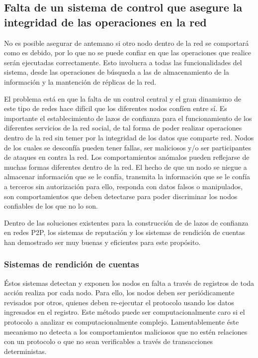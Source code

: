   \subsection{Falta de un sistema de control que asegure la integridad de las operaciones en la red}

    No es posible asegurar de antemano si otro nodo dentro de la red se
    comportará como es debido, por lo que no se puede confiar en que las
    operaciones que realice serán ejecutadas correctamente. Esto involucra a todas
    las funcionalidades del sistema, desde las operaciones de búsqueda a las de
    almacenamiento de la información y la mantención de réplicas de la red. 
    
    El problema está en que la falta de un control central y el gran dinamismo de este tipo de redes hace difícil que
    los diferentes nodos confíen entre sí. Es importante el establecimiento de
    lazos de confianza para el funcionamiento de los diferentes servicios de la red
    social, de tal forma de poder realizar operaciones dentro de la red sin temer
    por la integridad de los datos que comparte red. Nodos de los cuales se
    desconfía pueden tener fallas, ser maliciosos y/o ser participantes de ataques en
    contra la red.
    Los comportamientos anómalos pueden reflejarse de muchas formas
    diferentes dentro de la red. El hecho de que un nodo se niegue a almacenar
    información que se le confía, transmita la información que se le confía a
    terceros sin autorización para ello, responda con datos falsos o manipulados,
    son comportamientos que deben detectarse para poder discriminar los nodos
    confiables de los que no lo son.
    
    Dentro de las soluciones existentes para la construcción de de lazos de
    confianza en redes P2P, los sistemas de reputación y los sistemas de
    rendición de cuentas han demostrado ser muy buenas y eficientes para este propósito.
    
    \subsubsection{Sistemas de rendición de cuentas}
    Éstos sistemas detectan y exponen los nodos en falta a través de registros de
    toda acción realiza por cada nodo. Para ello, los nodos deben ser
    periódicamente revisados por otros, quienes deben re-ejecutar el protocolo
    usando los datos ingresados en el registro. Este método puede ser
    computacionalmente caro si el protocolo a analizar es computacionalmente complejo.
    Lamentablemente éste mecanismo no detecta a los comportamientos maliciosos que no estén
    relaciones con un protocolo o que no sean verificables a través de
    transacciones deterministas.
    
